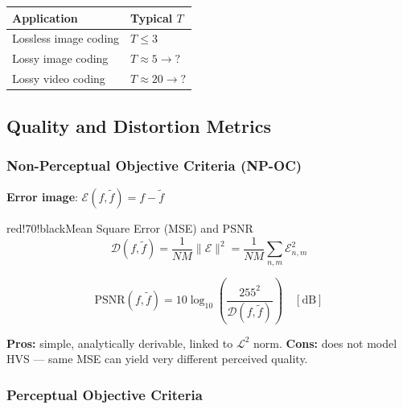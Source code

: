 \begin{center}
\begin{tabular}{|l|l|}
\hline
\textbf{Application} & \textbf{Typical $T$} \\ \hline
Lossless image coding & $T \leq 3$ \\ \hline
Lossy image coding & $T \approx 5 \to ?$ \\ \hline
Lossy video coding & $T \approx 20 \to ?$ \\ \hline
\end{tabular}
\end{center}

\subsection{Quality and Distortion Metrics}

\subsubsection{Non-Perceptual Objective Criteria (NP-OC)}

\textbf{Error image}: $\mathcal{E}(f, \tilde{f}) = f - \tilde{f}$

\begin{calloutbox}{red!70!black}{Mean Square Error (MSE) and PSNR}
\[
\mathcal{D}(f,\tilde{f}) = \frac{1}{NM}\|\mathcal{E}\|^2 = \frac{1}{NM}\sum_{n,m}\mathcal{E}_{n,m}^2
\]

\[
\text{PSNR}(f,\tilde{f}) = 10\log_{10}\!\left(\frac{255^2}{\mathcal{D}(f,\tilde{f})}\right) \quad [\text{dB}]
\]

\textbf{Pros:} simple, analytically derivable, linked to $\mathcal{L}^2$ norm. \textbf{Cons:} does not model HVS — same MSE can yield very different perceived quality.
\end{calloutbox}

\subsubsection{Perceptual Objective Criteria}


